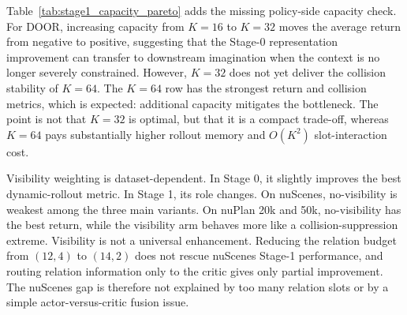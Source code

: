 \documentclass[10pt,journal,compsoc]{IEEEtran}
\begin{document}
Table~\ref{tab:stage1_capacity_pareto} adds the missing policy-side capacity check. For DOOR, increasing capacity from $K=16$ to $K=32$ moves the average return from negative to positive, suggesting that the Stage-0 representation improvement can transfer to downstream imagination when the context is no longer severely constrained. However, $K=32$ does not yet deliver the collision stability of $K=64$. The $K=64$ row has the strongest return and collision metrics, which is expected: additional capacity mitigates the bottleneck. The point is not that $K=32$ is optimal, but that it is a compact trade-off, whereas $K=64$ pays substantially higher rollout memory and $O(K^2)$ slot-interaction cost.

Visibility weighting is dataset-dependent. In Stage 0, it slightly improves the best dynamic-rollout metric. In Stage 1, its role changes. On nuScenes, no-visibility is weakest among the three main variants. On nuPlan 20k and 50k, no-visibility has the best return, while the visibility arm behaves more like a collision-suppression extreme. Visibility is not a universal enhancement. Reducing the relation budget from $(12,4)$ to $(14,2)$ does not rescue nuScenes Stage-1 performance, and routing relation information only to the critic gives only partial improvement. The nuScenes gap is therefore not explained by too many relation slots or by a simple actor-versus-critic fusion issue.

\begin{table}[!t]
\caption{nuScenes Stage-1 ablations under the same 700-scene protocol. Neither a smaller relation budget nor relation-to-critic-only fusion rescues the default decoupled policy.}
\label{tab:nuscenes_aux_ablation}
\centering
{}
\end{table}
\end{document}
